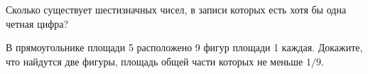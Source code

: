 %
%


\begin{problems}

\item
Сколько существует шестизначных чисел, в записи которых есть хотя бы одна
четная цифра?

\item
В прямоугольнике площади 5 расположено 9 фигур площади 1 каждая.
Докажите, что найдутся две фигуры, площадь общей части которых не меньше $1/9$.

\end{problems}

